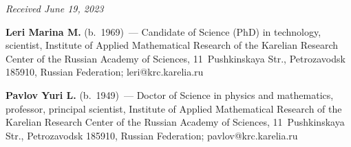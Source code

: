 \vspace*{-6pt}

\hfill{\small\textit{Received June 19, 2023}} 

\vspace*{-18pt}
     
     \Contr
     
     \vspace*{-3pt}

\noindent
\textbf{Leri Marina M.} (b.\ 1969)~--- Candidate of Science (PhD) in technology, 
scientist,
Institute of Applied Mathematical Research of the Karelian Research Center of 
the Russian Academy of Sciences,
11~Pushkinskaya Str., Petrozavodsk 185910, Russian Federation; 
\mbox{leri@krc.karelia.ru}

\vspace*{3pt}

\noindent
\textbf{Pavlov Yuri L.} (b.\ 1949)~--- Doctor of Science in physics and 
mathematics, professor, principal scientist, Institute of Applied Mathematical 
Research of the Karelian Research Center of the Russian Academy of Sciences, 11~Pushkinskaya Str., Petrozavodsk 185910, Russian Federation; 
\mbox{pavlov@krc.karelia.ru}



\label{end\stat}

\renewcommand{\bibname}{\protect\rm Литература} 